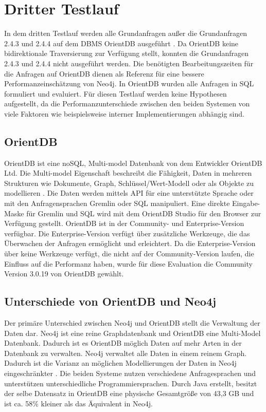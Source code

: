 \section{Dritter Testlauf}
In dem dritten Testlauf werden alle Grundanfragen außer die Grundanfragen 2.4.3 und 2.4.4 auf dem DBMS OrientDB ausgeführt \parencite{OrientDB}. Da OrientDB keine bidirektionale Traversierung zur Verfügung stellt, konnten die Grundanfragen 2.4.3 und 2.4.4 nicht ausgeführt werden. Die benötigten Bearbeitungszeiten für die Anfragen auf OrientDB dienen als Referenz für eine bessere Performanzeinschätzung von Neo4j. In OrientDB wurden alle Anfragen in SQL formuliert und evaluiert. Für diesen Testlauf werden keine Hypothesen aufgestellt, da die Performanzunterschiede zwischen den beiden Systemen von viele Faktoren wie beispielsweise interner Implementierungen abhängig sind. 
\subsection{OrientDB}
OrientDB ist eine noSQL,  Multi-model Datenbank von dem Entwickler OrientDB Ltd. Die Multi-model Eigenschaft beschreibt die Fähigkeit, Daten in mehreren Strukturen wie Dokumente, Graph, Schlüssel/Wert-Modell oder als Objekte zu modellieren \parencite{OrientDB}. Die Daten werden mittels API für eine unterstützte Sprache oder mit den Anfragensprachen Gremlin oder SQL manipuliert. Eine direkte Eingabe-Maske für Gremlin und SQL wird mit dem OrientDB Studio für den Browser zur Verfügung gestellt. OrientDB ist in der Community- und Enterprise-Version verfügbar. Die Enterprise-Version verfügt über zusätzliche Werkzeuge, die das Überwachen der Anfragen ermöglicht und erleichtert. Da die Enterprise-Version über keine Werkzeuge verfügt, die nicht auf der Community-Version laufen, die Einfluss auf die  Performanz haben, wurde für diese Evaluation die Community Version 3.0.19 von OrientDB gewählt. 
\subsection{Unterschiede von OrientDB und Neo4j}
Der primäre Unterschied zwischen Neo4j und OrientDB stellt die Verwaltung der Daten dar. Neo4j ist eine reine Graphdatenbank und OrientDB eine Multi-Model Datenbank. Dadurch ist es OrientDB möglich Daten auf mehr Arten in der Datenbank zu verwalten. Neo4j verwaltet alle Daten in einem reinem Graph. Dadurch ist die Varianz an möglichen Modellierungen der Daten in Neo4j eingeschränkter \parencite{fernandes2018graph}. Die beiden Systeme nutzen verschiedene Anfragesprachen und unterstützen unterschiedliche Programmiersprachen. Durch Java erstellt, besitzt der selbe Datensatz in OrientDB eine physische Gesamtgröße von 43,3 GB und ist ca. 58\% kleiner als das Äquivalent in Neo4j.
